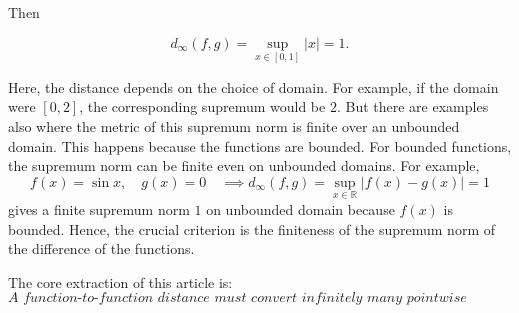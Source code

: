 \documentclass{article}
\begin{document}
Then

\[
d_\infty(f,g)
=
\sup_{x\in[0,1]}|x|
=
1.
\]

Here, the distance depends on the choice of domain. For example, if the domain were $[0,2]$, the corresponding supremum would be $2$. But there are examples also where the metric of this supremum norm is finite over an unbounded domain. This happens because the functions are bounded. For bounded functions, the supremum norm can be finite even on unbounded domains. For example,
\[
f(x)=\sin x,\quad g(x)=0\quad\implies d_\infty(f,g)=\sup_{x\in\mathbb{R}}|f(x)-g(x)|=1
\]
gives a finite supremum norm $1$ on unbounded domain because $f(x)$ is bounded.
Hence, the crucial criterion is the finiteness of the supremum norm of the difference of the functions.

The core extraction of this article is:
\[
\boxed{\textit{
A function-to-function distance must convert infinitely many
pointwise differences into one scalar quantity.}}
\]
\end{document}
